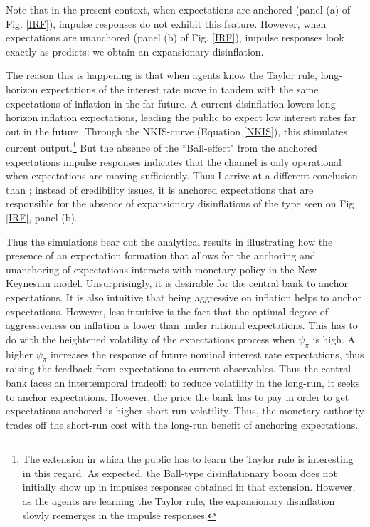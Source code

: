 \documentclass[11pt]{article}
\renewcommand{\[}{\begin{equation}}
\renewcommand{\]}{\end{equation}}
\begin{document}
Note that in the present context, when expectations are anchored (panel (a) of Fig. \ref{IRF}), impulse responses do not exhibit this feature. However, when expectations are unanchored (panel (b) of Fig. \ref{IRF}), impulse responses look exactly as \cite{ball1994credible} predicts: we obtain an expansionary disinflation. 

The reason this is happening is that when agents know the Taylor rule, long-horizon expectations of the interest rate move in tandem with the same expectations of inflation in the far future. A current disinflation lowers long-horizon inflation expectations, leading the public to expect low interest rates far out in the future. Through the NKIS-curve (Equation \ref{NKIS}), this stimulates current output.\footnote{The extension in which the public has to learn the Taylor rule is interesting in this regard. As expected, the Ball-type disinflationary boom does not initially show up in impulses responses obtained in that extension. However, as the agents are learning the Taylor rule, the expansionary disinflation slowly reemerges in the impulse responses.} But the absence of the ``Ball-effect" from the anchored expectations impulse responses indicates that the channel is only operational when expectations are moving sufficiently. Thus I arrive at a different conclusion than \cite{ball1994credible}; instead of credibility issues, it is anchored expectations that are responsible for the absence of expansionary disinflations of the type seen on Fig \ref{IRF}, panel (b).

Thus the simulations bear out the analytical results in illustrating how the presence of an expectation formation that allows for the anchoring and unanchoring of expectations interacts with monetary policy in the New Keynesian model. Unsurprisingly, it is desirable for the central bank to anchor expectations. It is also intuitive that being aggressive on inflation helps to anchor expectations. However, less intuitive is the fact that the optimal degree of aggressiveness on inflation is lower than under rational expectations. This has to do with the heightened volatility of the expectations process when $\psi_{\pi}$ is high. A higher $\psi_{\pi}$ increases the response of future nominal interest rate expectations, thus raising the feedback from expectations to current observables. Thus the central bank faces an intertemporal tradeoff: to reduce volatility in the long-run, it seeks to anchor expectations. However, the price the bank has to pay in order to get expectations anchored is higher short-run volatility. Thus, the monetary authority trades off the short-run cost with the long-run benefit of anchoring expectations.
\end{document}
